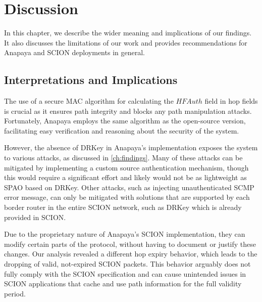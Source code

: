 \chapter{Discussion}
\label{ch:discussion}



In this chapter, we describe the wider meaning and implications of our findings.
It also discusses the limitations of our work and provides recommendations for Anapaya and SCION deployments in general.


\section{Interpretations and Implications}
The use of a secure MAC algorithm for calculating the $HFAuth$ field in hop fields is crucial as it ensures path integrity and blocks any path manipulation attacks.
Fortunately, Anapaya employs the same algorithm as the open-source version, facilitating easy verification and reasoning about the security of the system.

However, the absence of DRKey in Anapaya's implementation exposes the system to various attacks, as discussed in \cref{ch:findings}.
Many of these attacks can be mitigated by implementing a custom source authentication mechanism, though this would require a significant effort and likely would not be as lightweight as SPAO based on DRKey.
Other attacks, such as injecting unauthenticated SCMP error message, can only be mitigated with solutions that are supported by each border router in the entire SCION network, such as DRKey which is already provided in SCION.

Due to the proprietary nature of Anapaya's SCION implementation, they can modify certain parts of the protocol, without having to document or justify these changes.
Our analysis revealed a different hop expiry behavior, which leads to the dropping of valid, not-expired SCION packets.
This behavior arguably does not fully comply with the SCION specification and can cause unintended issues in SCION applications that cache and use path information for the full validity period.


